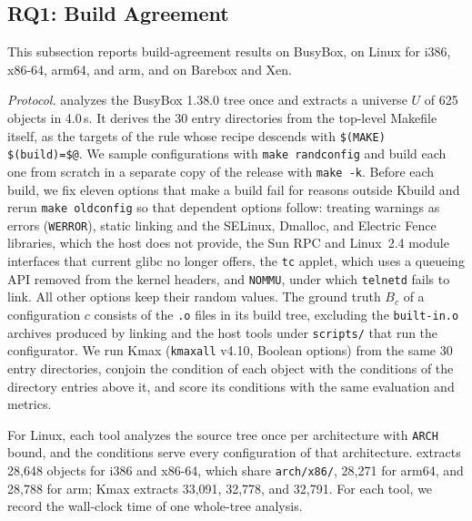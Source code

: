 \documentclass[acmsmall,screen,review,anonymous,nonacm]{acmart}
\begin{document}
\subsection{RQ1: Build Agreement}\label{sec:rq1}

This subsection reports build-agreement results on BusyBox, on Linux for i386, x86-64, arm64, and arm, and on Barebox and Xen.

\emph{Protocol.}
\tool{} analyzes the BusyBox 1.38.0 tree once and extracts a universe $U$ of 625 objects in 4.0\,s.
It derives the 30 entry directories from the top-level Makefile itself, as the targets of the rule whose recipe descends with \texttt{\$(MAKE) \$(build)=\$@}.
We sample configurations with \texttt{make randconfig} and build each one from scratch in a separate copy of the release with \texttt{make -k}.
Before each build, we fix eleven options that make a build fail for reasons outside Kbuild and rerun \texttt{make oldconfig} so that dependent options follow:
treating warnings as errors (\texttt{WERROR}),
static linking and the SELinux, Dmalloc, and Electric Fence libraries, which the host does not provide,
the Sun RPC and Linux~2.4 module interfaces that current glibc no longer offers, the \texttt{tc} applet, which uses a queueing API removed from the kernel headers,
and \texttt{NOMMU}, under which \texttt{telnetd} fails to link.
All other options keep their random values.
The ground truth $B_c$ of a configuration $c$ consists of the \texttt{.o} files in its build tree, excluding the \texttt{built-in.o} archives produced by linking and the host tools under \texttt{scripts/} that run the configurator.
We run Kmax (\texttt{kmaxall} v4.10, Boolean options) from the same 30 entry directories, conjoin the condition of each object with the conditions of the directory entries above it, and score its conditions with the same evaluation and metrics.

For Linux, each tool analyzes the source tree once per architecture with \texttt{ARCH} bound, and the conditions serve every configuration of that architecture.
\tool{} extracts 28,648 objects for i386 and x86-64, which share \texttt{arch/x86/}, 28,271 for arm64, and 28,788 for arm; Kmax extracts 33,091, 32,778, and 32,791.
For each tool, we record the wall-clock time of one whole-tree analysis.
\end{document}
